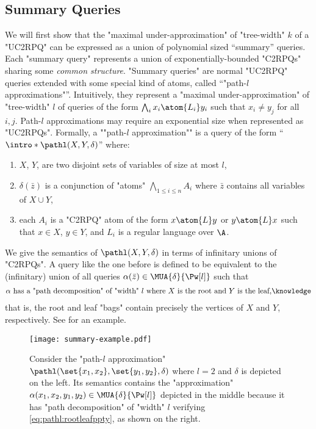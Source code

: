 \subsection{\AP{}Summary Queries}
We will first show that the "maximal under-approximation" of "tree-width" $k$ of a "UC2RPQ" can be expressed as a union of polynomial sized ``summary'' queries. Each "summary query" represents a union of exponentially-bounded "C2RPQs" sharing some \emph{common structure}. 
"Summary queries" are normal "UC2RPQ" queries extended with some special kind of atoms, called ``"path-$l$ approximations"''. 
Intuitively, they represent a "maximal under-approximation" of "tree-width" $l$ of queries of the form $\bigwedge_i x_i \atom{L_i} y_i$ such that $x_i \neq y_j$ for all $i,j$. 
Path-$l$ approximations may require an exponential size when represented as "UC2RPQs".
%
\AP Formally, a ""path-$l$ approximation"" is a query of the form ``$\intro*\pathl(X, Y, \delta)$''
where: 
\begin{enumerate}
	\item $X$, $Y$, are two disjoint sets of variables of size at most $l$, 
	\item $\delta(\bar z)$ is a conjunction of "atoms" $\bigwedge_{1 \leq i \leq n} A_i$ where $\bar z$ contains all variables of $X \cup Y$,
	\item each $A_i$ is a "C2RPQ" atom of the form $x \atom{L} y$ or $y \atom{L} x$  such that $x \in X$, $y \in Y$, and $L_i$ is a regular language over $\A$.
\end{enumerate}
We give the semantics of $\pathl(X, Y, \delta)$ in terms of infinitary unions of "C2RPQs".
A query like the one before is defined to be equivalent to the (infinitary) union of all queries $\alpha(\bar z) \in \MUA{\delta}{\Pw[l]}$ such that
\begin{align}
	\text{$\alpha$ has a "path decomposition" of "width" $l$ where $X$ is the root and $Y$ is the leaf,}\AP\label{eq:pathl:rootleafppty}
\end{align}
that is, the root and leaf "bags" contain precisely the vertices of $X$ and $Y$, respectively.
 See  for an example.
\begin{figure}
  \centering
  \texttt{[image: summary-example.pdf]}
  \caption{
	\AP\label{fig:l-path-example}
	Consider the "path-$l$ approximation" $\pathl(\set{x_1,x_2}, \set{y_1,y_2},\delta)$ where $l=2$ and $\delta$ is depicted on the left. Its semantics contains the "approximation" $\alpha(x_1,x_2,y_1,y_2) \in \MUA{\delta}{\Pw[l]}$ depicted in the middle because it has "path decomposition" of "width" $l$ verifying \eqref{eq:pathl:rootleafppty}, as shown on the right.
	}
\end{figure}

